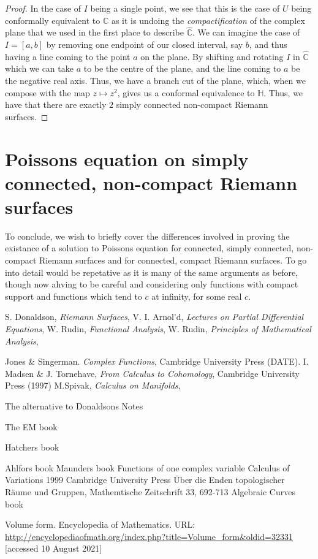 \documentclass[11pt]{report}
\theoremstyle{definition}
\begin{document}
\begin{proof}
In the case of $I$ being a single point, we see that this is the case of $U$ being conformally equivalent to $\mathbb{C}$ as it is undoing the \emph{compactification} of the complex plane that we used in the first place to describe $\widehat{\mathbb{C}}$. We can imagine the case of $I=[a,b]$ by removing one endpoint of our closed interval, say $b$, and thus having a line coming to the point $a$ on the plane. By shifting and rotating $I$ in $\widehat{\mathbb{C}}$ which we can take $a$ to be the centre of the plane, and the line coming to $a$ be the negative real axis. Thus, we have a branch cut of the plane, which, when we compose with the map $z \mapsto z^2$, gives us a conformal equivalence to $\mathbb{H}$. Thus, we have that there are exactly $2$ simply connected non-compact Riemann surfaces.
\end{proof}

\section{Poissons equation on simply connected, non-compact Riemann surfaces}
To conclude, we wish to briefly cover the differences involved in proving the existance of a solution to Poissons equation for connected, simply connected, non-compact Riemann surfaces and for connected, compact Riemann surfaces. To go into detail would be repetative as it is many of the same arguments as before, though now ahving to be careful and considering only functions with compact support and functions which tend to $c$ at infinity, for some real $c$.
%
\newpage
\begin{thebibliography}{99}
 S. Donaldson, {\em Riemann Surfaces},
 V. I. Arnol'd, {\em Lectures on Partial Differential Equations},
 W. Rudin, {\em Functional Analysis},
 W. Rudin, {\em Principles of Mathematical Analysis}, 

 Jones \& Singerman. {\em Complex Functions}, Cambridge University Press (DATE).
 I. Madsen \& J. Tornehave, {\em From Calculus to Cohomology}, Cambridge University Press (1997)
 M.Spivak, {\em Calculus on Manifolds}, 

 The alternative to Donaldsons Notes

 The EM book

 Hatchers book

 Ahlfors book
 Maunders book
  Functions of one complex variable
 Calculus of Variations 1999 Cambridge University Press
 \"{U}ber die Enden topologischer R\"{a}ume und Gruppen, Mathemtische Zeitschrift 33, 692-713
%
 Algebraic Curves book

 Volume form. Encyclopedia of Mathematics. URL: \url{http://encyclopediaofmath.org/index.php?title=Volume_form&oldid=32331} [accessed 10 August 2021]

\end{thebibliography}
\end{document}
